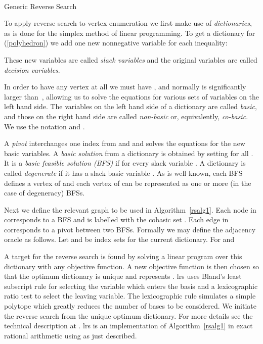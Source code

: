 \documentclass[a4paper,11pt]{article}   \usepackage{authblk} \usepackage[top=1.9cm,bottom=1.9cm,left=1.9cm,right=1.9cm]{geometry}
\newcommand{\progname}{\textsf}
\newcommand{\lrs}{\progname{lrs}\xspace}
\begin{document}
\begin{algorithm}
\begin{algorithmic}[1]
        \State ~~~~~~
        \Repeat
       	\While {}
                \State 
		\If {}  
			\State   
			\State  
                        \State          
                \EndIf
        \EndWhile
        \If {}                    
		\State 
                \State        
        \EndIf
\EndProcedure
\end{algorithmic}
\caption{Generic Reverse Search}
\label{rsalg1}
\end{algorithm}


To apply reverse search to vertex enumeration we first
make use of \emph{dictionaries}, as is done for the
simplex method of linear programming.
To get a dictionary for (\ref{polyhedron}) we
add one new nonnegative variable for each inequality:

These new variables are called \emph{slack variables} and the
original variables are called
\emph{decision variables}.

In order to have any vertex at all we must
have , and normally  is significantly larger than~,
allowing us to solve the equations for various sets of variables on
the left hand side.
The variables on the left hand side of a dictionary are called
\emph{basic}, and those on the right hand side are called \emph{non-basic}
or, equivalently, \emph{co-basic}.
We use the notation
 and
.

A \emph{pivot} interchanges one index from  and  and solves the equations
for the new basic variables.
A \emph{basic solution} from a dictionary is obtained by setting
 for all .
It is a \emph{basic feasible solution (BFS)} if  for every slack
variable . A dictionary is called
\emph{degenerate} if it has a slack basic variable .
As is well known, each BFS defines a vertex of  and each vertex of  can
be represented as one or more (in the case of degeneracy) BFSs. 

Next we define the relevant graph  to be used in Algorithm~\ref{rsalg1}.
Each node in  corresponds to a BFS and is labelled with the cobasic set .
Each edge in  corresponds to a pivot between two BFSs. 
Formally we may define the adjacency
oracle as follows. Let  and  be index sets for the current dictionary.
For  and 


A target  for the
reverse search is found by solving a linear program over this dictionary
with any objective function. A new objective
function is then chosen so that
the optimum dictionary is unique and represents .
\lrs uses Bland's least subscript rule for selecting the variable which
enters the basis and a lexicographic ratio test to select the leaving variable.
The lexicographic rule simulates a simple polytope which greatly reduces the number
of bases to be considered. We initiate the reverse search from the unique optimum dictionary.
For more details see the technical description at \cite{lrs}.
\lrs is an implementation of Algorithm~\ref{rsalg1} in exact rational arithmetic
using  as just described.
\end{document}
